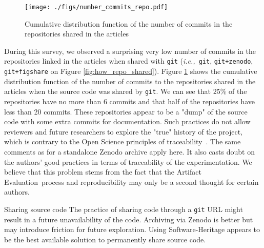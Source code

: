 \documentclass[sigconf,natbib=false]{acmart}
\newcommand{\ie}{\emph{i.e.,}}
\newcommand{\aeval}{Artifact Evaluation}
\newcommand{\todo}[1]{{\color{red}{TODO: #1}}}
\begin{document}

\begin{figure}
  \centering
  \texttt{[image: ./figs/number\_commits\_repo.pdf]}
  \caption{Cumulative distribution function of the number of commits in the repositories shared in the articles}\label{fig:number_commits_repo}
\end{figure}

During this survey, we observed a surprising very low number of commits in the repositories linked in the articles when shared with \texttt{git} (\ie\ \texttt{git}, \texttt{git+zenodo}, \texttt{git+figshare} on Figure \ref{fig:how_repo_shared}).
Figure \ref{fig:number_commits_repo} shows the cumulative distribution function of the number of commits to the repositories shared in the articles when the source code was shared by \texttt{git}.
We can see that 25\% of the repositories have no more than 6 commits and that half of the repositories have less than 20 commits.
These repositories appear to be a "dump" of the source code with some extra commits for documentation.
Such practices do not allow reviewers and future researchers to explore the "true" history of the project, which is contrary to the Open Science principles of traceability\ \cite{openscience_unesco}.
The same comments as for a standalone Zenodo archive apply here.
It also casts doubt on the authors' good practices in terms of traceability of the experimentation.
We believe that this problem stems from the fact that the \aeval\ process and reproducibility may only be a second thought for certain authors.

\begin{lesson}{Sharing source code}{}
  The practice of sharing code through a \texttt{git} URL might result in a future unavailability of the code.
  Archiving via Zenodo is better but may introduce friction for future exploration.
  Using Software-Heritage appears to be the best available solution to permanently share source code.
\end{lesson}
\end{document}
